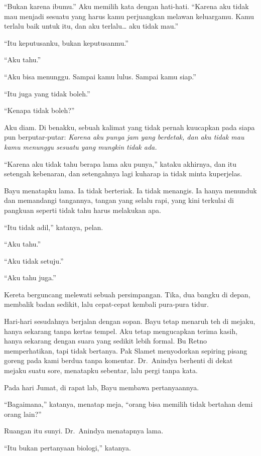 \documentclass[11pt,twoside,openany]{book}
\makeatletter
\newcommand{\scenebreak}{\par\vspace{0.9em}{\centering\textsc{*\hspace{0.7em}*\hspace{0.7em}*}\par}\vspace{0.9em}\@afterindentfalse\@afterheading}
\makeatother
\begin{document}
``Bukan karena ibumu.'' Aku memilih kata dengan hati-hati. ``Karena aku tidak mau menjadi sesuatu yang harus kamu perjuangkan melawan keluargamu. Kamu terlalu baik untuk itu, dan aku terlalu\ldots{} aku tidak mau.''

``Itu keputusanku, bukan keputusanmu.''

``Aku tahu.''

``Aku bisa menunggu. Sampai kamu lulus. Sampai kamu siap.''

``Itu juga yang tidak boleh.''

``Kenapa tidak boleh?''

Aku diam. Di benakku, sebuah kalimat yang tidak pernah kuucapkan pada siapa pun berputar-putar: \emph{Karena aku punya jam yang berdetak, dan aku tidak mau kamu menunggu sesuatu yang mungkin tidak ada.}

``Karena aku tidak tahu berapa lama aku punya,'' kataku akhirnya, dan itu setengah kebenaran, dan setengahnya lagi kuharap ia tidak minta kuperjelas.

Bayu menatapku lama. Ia tidak berteriak. Ia tidak menangis. Ia hanya menunduk dan memandangi tangannya, tangan yang selalu rapi, yang kini terkulai di pangkuan seperti tidak tahu harus melakukan apa.

``Itu tidak adil,'' katanya, pelan.

``Aku tahu.''

``Aku tidak setuju.''

``Aku tahu juga.''

Kereta berguncang melewati sebuah persimpangan. Tika, dua bangku di depan, membalik badan sedikit, lalu cepat-cepat kembali pura-pura tidur.

\scenebreak
Hari-hari sesudahnya berjalan dengan sopan. Bayu tetap menaruh teh di mejaku, hanya sekarang tanpa kertas tempel. Aku tetap mengucapkan terima kasih, hanya sekarang dengan suara yang sedikit lebih formal. Bu Retno memperhatikan, tapi tidak bertanya. Pak Slamet menyodorkan sepiring pisang goreng pada kami berdua tanpa komentar. Dr.~Anindya berhenti di dekat mejaku suatu sore, menatapku sebentar, lalu pergi tanpa kata.

Pada hari Jumat, di rapat lab, Bayu membawa pertanyaannya.

``Bagaimana,'' katanya, menatap meja, ``orang bisa memilih tidak bertahan demi orang lain?''

Ruangan itu sunyi. Dr.~Anindya menatapnya lama.

``Itu bukan pertanyaan biologi,'' katanya.
\end{document}
